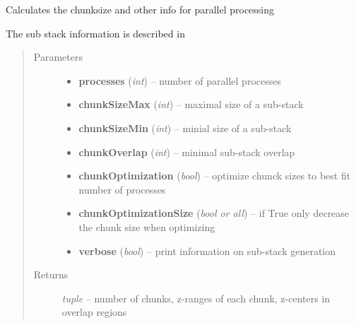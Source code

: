 \documentclass[letterpaper,10pt,english]{sphinxmanual}
\begin{document}
\begin{fulllineitems}
\label{api/ClearMap.ImageProcessing:ClearMap.ImageProcessing.StackProcessing.calculateChunkSize}
Calculates the chunksize and other info for parallel processing

The sub stack information is described in 
\begin{quote}\begin{description}
\item[{Parameters}] \leavevmode\begin{itemize}
\item {} 
\textbf{processes} (\emph{int}) --
number of parallel processes

\item {} 
\textbf{chunkSizeMax} (\emph{int}) --
maximal size of a sub-stack

\item {} 
\textbf{chunkSizeMin} (\emph{int}) --
minial size of a sub-stack

\item {} 
\textbf{chunkOverlap} (\emph{int}) --
minimal sub-stack overlap

\item {} 
\textbf{chunkOptimization} (\emph{bool}) --
optimize chunck sizes to best fit number of processes

\item {} 
\textbf{chunkOptimizationSize} (\emph{bool or all}) --
if True only decrease the chunk size when optimizing

\item {} 
\textbf{verbose} (\emph{bool}) --
print information on sub-stack generation

\end{itemize}

\item[{Returns}] \leavevmode
\emph{tuple} --
number of chunks, z-ranges of each chunk, z-centers in overlap regions

\end{description}\end{quote}

\end{fulllineitems}
\end{document}
